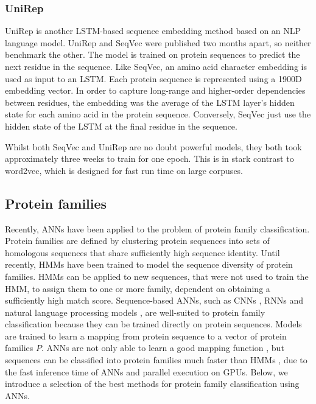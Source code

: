 \subsubsection{UniRep}

UniRep \cite{Alley2019} is another LSTM-based sequence embedding method based on an NLP language model.
UniRep and SeqVec were published two months apart, so neither benchmark the other.
The model is trained on protein sequences to predict the next residue in the sequence.
Like SeqVec, an amino acid character embedding is used as input to an LSTM.
Each protein sequence is represented using a \num{1900}D embedding vector.
In order to capture long-range and higher-order dependencies between residues, the embedding was the average of the LSTM layer's hidden state for each amino acid in the protein sequence.
Conversely, SeqVec just use the hidden state of the LSTM at the final residue in the sequence.

Whilst both SeqVec and UniRep are no doubt powerful models, they both took approximately three weeks to train for one epoch.
This is in stark contrast to word2vec, which is designed for fast run time on large corpuses.

\subsection{Protein families}
\label{sec:intro-protein-families}

Recently, ANNs have been applied to the problem of protein family classification. Protein families are defined by clustering protein sequences into sets of homologous sequences that share sufficiently high sequence identity. Until recently, HMMs have been trained to model the sequence diversity of protein families. HMMs can be applied to new sequences, that were not used to train the HMM, to assign them to one or more family, dependent on obtaining a sufficiently high match score. Sequence-based ANNs, such as CNNs \cite{Hou2018,Seo2018,Bileschi2019,Zhang2019}, RNNs \cite{Jin2019} and natural language processing models \cite{Zhang2019}, are well-suited to protein family classification because they can be trained directly on protein sequences. Models are trained to learn a mapping from protein sequence to a vector of protein families $P$. ANNs are not only able to learn a good mapping function \cite{Hou2018,Seo2018,Bileschi2019}, but sequences can be classified into protein families much faster than HMMs \cite{Seo2018,Bileschi2019}, due to the fast inference time of ANNs and parallel execution on GPUs. Below, we introduce a selection of the best methods for protein family classification using ANNs.

